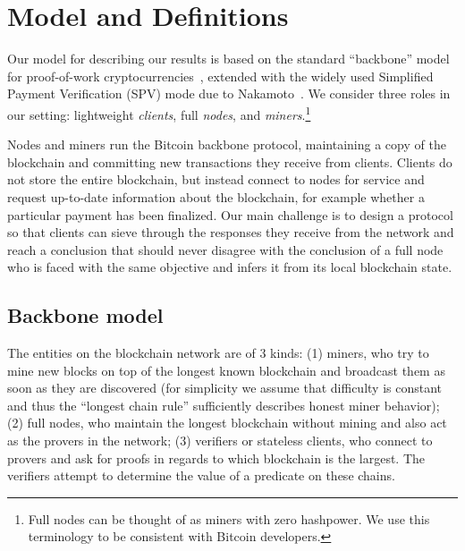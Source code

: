 \section{Model and Definitions}
\label{sec.model}
Our model for describing our results is based on the standard ``backbone'' model
for proof-of-work cryptocurrencies~\cite{backbone}, extended with the widely
used Simplified Payment Verification (SPV) mode due to Nakamoto~\cite{bitcoin}.
We consider three roles in our setting: lightweight \emph{clients},  full
\emph{nodes}, and \emph{miners}.\footnote{Full nodes can be thought of as miners
with zero hashpower. We use this terminology to be consistent with Bitcoin
developers.}

Nodes and miners run the Bitcoin backbone protocol, maintaining a copy of the
blockchain and committing new transactions they receive from clients. Clients do
not store the entire blockchain, but instead connect to nodes for service and
request up-to-date information about the blockchain, for example whether a
particular payment has been finalized. Our main challenge is to design a
protocol so that clients can sieve through  the responses they receive from the
network and reach a conclusion that should never disagree with the conclusion of
a full  node who is faced with the same objective and infers it from its local
blockchain  state.

\subsection{Backbone model}


The entities on the blockchain network are of 3 kinds: (1) miners, who try to
mine new blocks on top of the longest known blockchain and broadcast them as
soon as they are discovered (for simplicity we assume that difficulty is
constant and thus the ``longest chain rule'' sufficiently describes honest miner
behavior); (2) full nodes, who maintain the longest blockchain without mining
and also act as the provers in the network; (3) verifiers or stateless clients,
who connect to provers and ask for proofs in regards to which blockchain is the
largest. The verifiers attempt to determine the value of a predicate on these
chains.

